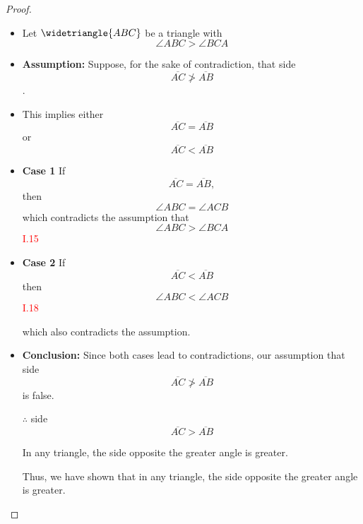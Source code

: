 \begin{proof}

\begin{itemize}

\item[]

\item Let 
$\widetriangle{ABC}$ be a triangle with 
\[\angle{ABC} > \angle{BCA}\]

\clearpage

\item \textbf{Assumption:} Suppose, for the sake of contradiction, that side 
\[\overline{AC} \not> \overline{AB}\]. 

\item This implies either 
\[\overline{AC} = \overline{AB}\] 
or
\[ \overline{AC} < \overline{AB}\]

\item \textbf{Case 1} If 
\[\overline{AC} = \overline{AB},\] 
then 
\[\angle{ABC} = \angle{ACB}\] 
which contradicts the assumption that 
\[\angle{ABC} > \angle{BCA}\]\hfill\textcolor{red}{I.15}

\item \textbf{Case 2} If 
\[\overline{AC} < \overline{AB}\]
then 
\[\angle{ABC} < \angle{ACB}\]\hfill\textcolor{red}{I.18} 

which also contradicts the assumption.

\clearpage

\item \textbf{Conclusion:} Since both cases lead to contradictions, our assumption that side 
\[\overline{AC} \not> \overline{AB}\] 
is false.

\item[$\therefore$] side 
\[\overline{AC} > \overline{AB}\]

In any triangle, the side opposite the greater angle is greater.

Thus, we have shown that in any triangle, the side opposite the greater angle is greater.

\end{itemize}

\end{proof}

\clearpage
